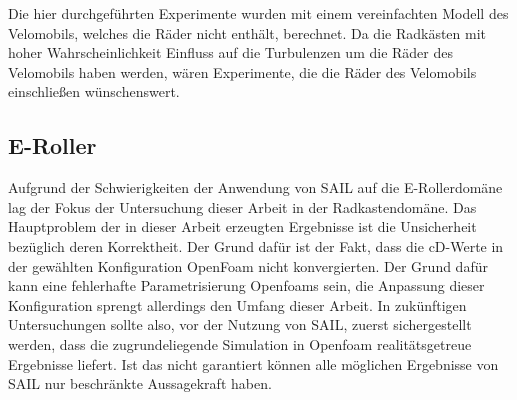 Die hier durchgeführten Experimente wurden mit einem vereinfachten Modell des Velomobils, welches die Räder nicht enthält, berechnet.
Da die Radkästen mit hoher Wahrscheinlichkeit Einfluss auf die Turbulenzen um die Räder des Velomobils haben werden, wären Experimente, die die Räder des Velomobils einschließen wünschenswert.

\subsection{E-Roller}

Aufgrund der Schwierigkeiten der Anwendung von SAIL auf die E-Rollerdomäne lag der Fokus der Untersuchung dieser Arbeit in der Radkastendomäne.
Das Hauptproblem der in dieser Arbeit erzeugten Ergebnisse ist die Unsicherheit bezüglich deren Korrektheit.
Der Grund dafür ist der Fakt, dass die cD-Werte in der gewählten Konfiguration OpenFoam nicht konvergierten.
Der Grund dafür kann eine fehlerhafte Parametrisierung Openfoams sein, die Anpassung dieser Konfiguration sprengt allerdings den Umfang dieser Arbeit.
In zukünftigen Untersuchungen sollte also, vor der Nutzung von SAIL, zuerst sichergestellt werden, dass die zugrundeliegende Simulation in Openfoam realitätsgetreue Ergebnisse liefert.
Ist das nicht garantiert können alle möglichen Ergebnisse von SAIL nur beschränkte Aussagekraft haben.

